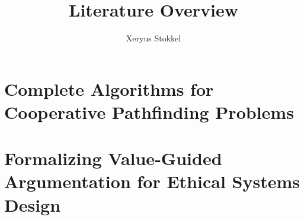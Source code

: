 \documentclass[a4paper]{article}
\title{Literature Overview}
\author{Xeryus Stokkel}
\date{}
\begin{document}
\maketitle

\section{Complete Algorithms for Cooperative Pathfinding 
Problems\cite{standley2010}}

\section{Formalizing Value-Guided Argumentation for Ethical Systems 
Design\cite{verheij2016}}



\end{document}
